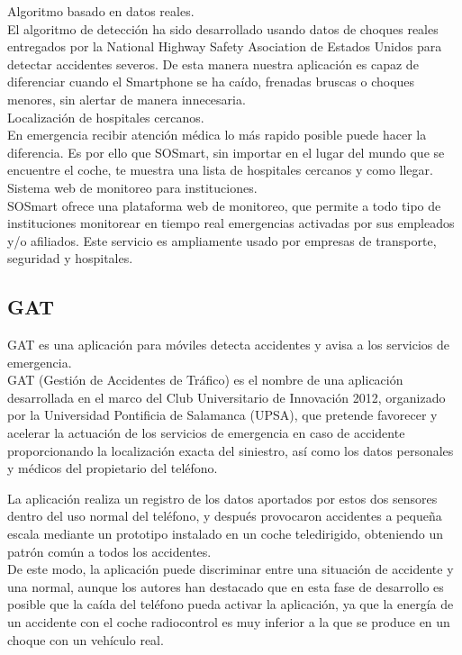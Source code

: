 Algoritmo basado en datos reales.\\
El algoritmo de detección ha sido desarrollado usando datos de choques reales entregados por la National Highway Safety Asociation de Estados Unidos para detectar accidentes severos.  De esta manera nuestra aplicación es capaz de diferenciar cuando el Smartphone se ha caído, frenadas bruscas o choques menores, sin alertar de manera innecesaria.\\

Localización de hospitales cercanos.\\
En emergencia recibir atención médica lo más rapido posible puede hacer la diferencia. Es por ello que SOSmart, sin importar en el lugar del mundo que se encuentre el coche, te muestra una lista de hospitales cercanos y como llegar.\\

Sistema web de monitoreo para instituciones.\\
SOSmart ofrece una plataforma web de monitoreo, que permite a todo tipo de instituciones monitorear en tiempo real emergencias activadas por sus empleados y/o afiliados.  Este servicio es ampliamente usado por empresas de transporte, seguridad y hospitales.\\

\subsection{GAT}

GAT es una aplicación para móviles detecta accidentes y avisa a los servicios de emergencia.\\

GAT (Gestión de Accidentes de Tráfico) es el nombre de una aplicación desarrollada en el marco del Club Universitario de Innovación 2012, organizado por la Universidad Pontificia de Salamanca (UPSA), que pretende favorecer y acelerar la actuación de los servicios de emergencia en caso de accidente proporcionando la localización exacta del siniestro, así como los datos personales y médicos del propietario del teléfono.

La aplicación realiza un registro de los datos aportados por estos dos sensores dentro del uso normal del teléfono, y después provocaron accidentes a pequeña escala mediante un prototipo instalado en un coche teledirigido, obteniendo un patrón común a todos los accidentes. \\

De este modo, la aplicación puede discriminar entre una situación de accidente y una normal, aunque los autores han destacado que en esta fase de desarrollo es posible que la caída del teléfono pueda activar la aplicación, ya que la energía de un accidente con el coche radiocontrol es muy inferior a la que se produce en un choque con un vehículo real. \\

